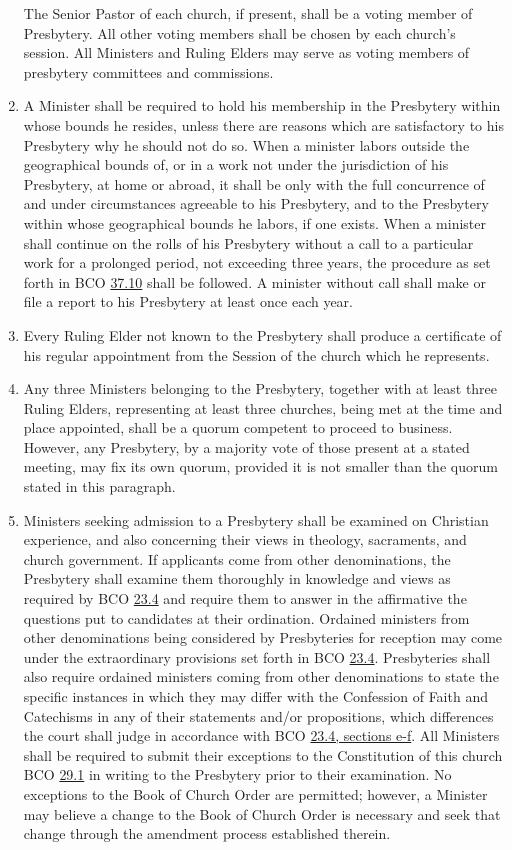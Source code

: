 \documentclass[
]{book}
\begin{document}
\begin{enumerate}
  The Senior Pastor of each church, if present, shall be a voting member of Presbytery. All other voting members shall be chosen by each church's session. All Ministers and Ruling Elders may serve as voting members of presbytery committees and commissions.
\item
  \protect\hypertarget{15.2}{\href{}{}}A Minister shall be required to hold his membership in the Presbytery within whose bounds he resides, unless there are reasons which are satisfactory to his Presbytery why he should not do so. When a minister labors outside the geographical bounds of, or in a work not under the jurisdiction of his Presbytery, at home or abroad, it shall be only with the full concurrence of and under circumstances agreeable to his Presbytery, and to the Presbytery within whose geographical bounds he labors, if one exists. When a minister shall continue on the rolls of his Presbytery without a call to a particular work for a prolonged period, not exceeding three years, the procedure as set forth in BCO \protect\hyperlink{37.10}{37.10} shall be followed. A minister without call shall make or file a report to his Presbytery at least once each year.
\item
  Every Ruling Elder not known to the Presbytery shall produce a certificate of his regular appointment from the Session of the church which he represents.
\item
  Any three Ministers belonging to the Presbytery, together with at least three Ruling Elders, representing at least three churches, being met at the time and place appointed, shall be a quorum competent to proceed to business. However, any Presbytery, by a majority vote of those present at a stated meeting, may fix its own quorum, provided it is not smaller than the quorum stated in this paragraph.
\item
  Ministers seeking admission to a Presbytery shall be examined on Christian experience, and also concerning their views in theology, sacraments, and church government. If applicants come from other denominations, the Presbytery shall examine them thoroughly in knowledge and views as required by BCO \protect\hyperlink{23.4}{23.4} and require them to answer in the affirmative the questions put to candidates at their ordination. Ordained ministers from other denominations being considered by Presbyteries for reception may come under the extraordinary provisions set forth in BCO \protect\hyperlink{23.4}{23.4}. Presbyteries shall also require ordained ministers coming from other denominations to state the specific instances in which they may differ with the Confession of Faith and Catechisms in any of their statements and/or propositions, which differences the court shall judge in accordance with BCO \protect\hyperlink{23.4.e}{23.4, sections e-f}. All Ministers shall be required to submit their exceptions to the Constitution of this church BCO \protect\hyperlink{29.1}{29.1} in writing to the Presbytery prior to their examination. No exceptions to the Book of Church Order are permitted; however, a Minister may believe a change to the Book of Church Order is necessary and seek that change through the amendment process established therein.

\end{enumerate}
\end{document}
